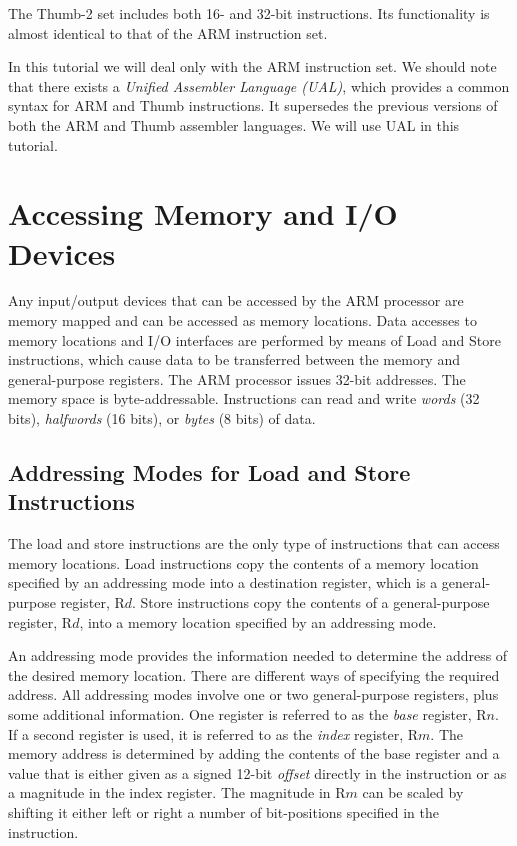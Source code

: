 \documentclass[11pt, twoside, pdftex]{article}
\begin{document}
The Thumb-2 set includes both 16- and 32-bit instructions.
Its functionality is almost identical to that of the ARM
instruction set.

In this tutorial we will deal only with the ARM instruction set.
We should note that there exists a {\it Unified Assembler
Language (UAL)}, which provides a common syntax for ARM and
Thumb instructions. It supersedes the previous versions of
both the ARM and Thumb assembler languages. We will use UAL
in this tutorial. 

\section{Accessing Memory and I/O Devices}

Any input/output devices that can be accessed by the ARM
processor are memory mapped and can be accessed as memory
locations. Data accesses to memory locations and I/O interfaces
are performed by means of Load and Store instructions, which cause data to be transferred between the memory and
general-purpose registers.
The ARM processor issues 32-bit addresses. The memory space is byte-addressable. Instructions can read and write {\it words} 
(32 bits), {\it halfwords} (16 bits), or {\it bytes} (8 bits) of data.

\subsection{Addressing Modes for Load and Store Instructions}

The load and store instructions are the only type of instructions
that can access memory locations.
Load instructions copy the contents of a memory location
specified by an addressing mode into a destination register,
which is a general-purpose register, R$d$.
Store instructions copy the contents of a general-purpose
register, R$d$, into a memory location specified by an
addressing mode.

An addressing mode provides the information needed to determine the address of the desired memory location. 
There are different ways of specifying the required address. 
All addressing modes involve one or two
general-purpose registers, plus some additional information.
One register is referred to as the {\it base} register, R$n$.
If a second register is used, it is referred to as the
{\it index} register, R$m$. The memory address is determined by
adding the contents of the base register and a value that is
either given as a signed 12-bit {\it offset} directly in the
instruction or as a magnitude in the index register.
The magnitude in R$m$ can be scaled by shifting it either left
or right a number of bit-positions specified in the instruction.
\end{document}
